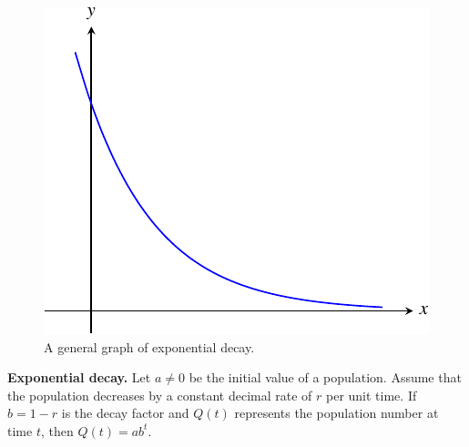 \documentclass[a4paper,oneside,12pt]{article}
\begin{document}
\begin{figure}[!htbp]
\centering
\includegraphics[scale=1.1]{image/11/exponential-decay.pdf}
\caption{%
  A general graph of exponential decay.
}
\label{fig:exponential_decay}
\end{figure}

\begin{theorem}
\label{thm:exponential_decay}
\textbf{Exponential decay.}
Let $a \neq 0$ be the initial value of a population.  Assume that the
population decreases by a constant decimal rate of $r$ per unit time.
If $b = 1 - r$ is the decay factor and $Q(t)$ represents the
population number at time $t$, then $Q(t) = ab^t$.
\end{theorem}
\end{document}
